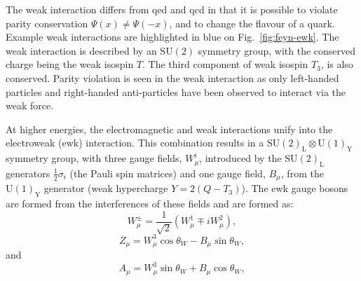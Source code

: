 The weak interaction differs from \acrshort{qed} and \acrshort{qcd} in that it is possible to violate parity conservation $\Psi(x)\neq\Psi(-x)$, and to change the flavour of a quark. 
Example weak interactions are highlighted in blue on Fig.~\ref{fig:feyn-ewk}.
The weak interaction is described by an $\mathrm{SU(2)}$ symmetry group, with the conserved charge being the weak isospin $T$.
The third component of weak isospin $T_{3}$, is also conserved.
Parity violation is seen in the weak interaction as only left-handed particles and right-handed anti-particles have been observed to interact via the weak force. 

At higher energies, the electromagnetic and weak interactions unify into the electroweak (\acrshort{ewk}) interaction.
This combination results in a $\mathrm{SU(2)_{L}}\otimes\mathrm{U(1)_{Y}}$ symmetry group, with three gauge fields, $W^{i}_{\mu}$, introduced by the $\mathrm{SU(2)_{L}}$ generators $\frac{1}{2}\sigma_{i}$ (the Pauli spin matrices) and one gauge field, $B_{\mu}$, from the $\mathrm{U(1)_{Y}}$ generator (weak hypercharge $Y = 2(Q-T_{3})$).
The \acrshort{ewk} gauge bosons are formed from the interferences of these fields and are formed as:
\begin{equation}
	W^{\pm}_{\mu} = \frac{1}{\sqrt{2}}(W^{1}_{\mu} \mp iW^{2}_{\mu}),
\end{equation}
\begin{equation}
	Z_{\mu} = W^{3}_{\mu}\cos{\theta_{W}} -  B_{\mu}\sin{\theta_{W}},
\end{equation}
and 
\begin{equation}
	A_{\mu} = W^{3}_{\mu}\sin{\theta_{W}} +  B_{\mu}\cos{\theta_{W}},
\end{equation}
